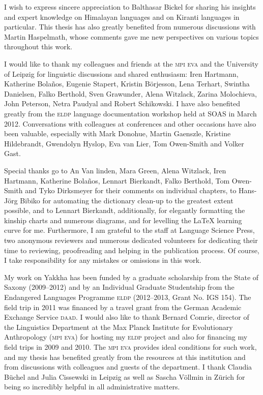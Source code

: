 \begin{refsection}
I wish to express sincere appreciation to Balthasar Bickel for sharing his insights and expert knowledge on Himalayan languages and on Kiranti languages in particular. This thesis has also greatly  benefited from numerous discussions with Martin Haspelmath, whose comments gave me new perspectives on various topics throughout this work. 

I would like to thank my colleagues and friends at the \textsc{mpi} \textsc{eva} and the University of Leipzig for linguistic discussions and shared enthusiasm: Iren Hartmann, Katherine Bolaños, Eugenie Stapert, Kristin Börjesson, Lena Terhart, Swintha Da\-niel\-sen, Falko Berthold, Sven Grawunder, Alena Witzlack, Zarina Molochieva, John Peterson, Netra Paudyal and Robert Schikowski. I have also benefited greatly from the  \textsc{eldp} language documentation workshop held at SOAS in March 2012. Conversations with colleagues at conferences and other occasions have also been valuable, especially with Mark Donohue, Martin Gaenszle, Kristine Hildebrandt, Gwendolyn Hyslop,  Eva van Lier,  Tom Owen-Smith and Volker Gast. 

Special thanks go to An Van linden,  Mara Green, Alena Witzlack, Iren Hartmann, Katherine Bolaños, Lennart Bierkandt, Falko Berthold, Tom Owen-Smith and Tyko Dirksmeyer for their comments on individual chapters, to Hans-Jörg Bibiko for auto\-mating the dictionary clean-up to the greatest extent possible, and to Lennart Bierkandt, additionally,  for elegantly formatting the kinship charts  and numerous diagrams, and for levelling the  LaTeX learning curve for me. Furthermore, I am grateful to the staff at Language Science Press, two anonymous reviewers and numerous dedicated volunteers for dedicating their time to reviewing, proofreading and helping in the publication process. Of course, I take responsibility for any mistakes or omissions in this work.

My work on Yakkha has been  funded by a graduate scholarship from the State of Saxony (2009–2012) and by an Individual Graduate Studentship from the Endangered Languages Programme \textsc{eldp} (2012–2013, Grant No. IGS 154). The field trip in 2011 was financed by a travel grant from the German Academic Exchange Service \textsc{daad}. I would also like to thank Bernard Comrie, director of the Linguistics Department at the Max Planck Institute for Evolutionary Anthropology (\textsc{mpi} \textsc{eva})  for hosting my \textsc{eldp} project and also for financing my field trips in 2009 and 2010. The \textsc{mpi} \textsc{eva} provides ideal conditions for such work, and my thesis has benefited greatly from the resources at this institution and from discussions with colleagues and guests of the department. I thank Claudia Büchel and Julia Cissewski in Leipzig as well as Sascha Völlmin in Zürich for being so incredibly helpful in all administrative matters. 


\end{refsection}
